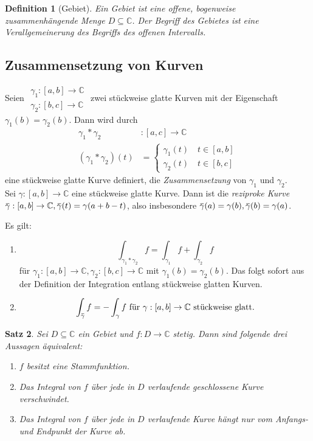 \documentclass[a4paper,12pt]{book}
\theoremstyle{newthm}
\newtheorem{thm}{Satz}[section]
\theoremstyle{newdef}
\newtheorem{defn}[thm]{Definition}
\theoremstyle{newrem}
\newcommand{\C}{\mathbb{C}}
\newcommand{\overbar}[1]{\mkern 1.5mu\overline{\mkern-1.5mu#1\mkern-1.5mu}\mkern 1.5mu}
\begin{document}
		\begin{defn}[Gebiet]
			Ein \emph{Gebiet} ist eine offene, bogenweise zusammenhängende Menge $ D \subseteq \C $. Der Begriff des Gebietes ist eine Verallgemeinerung des Begriffs des offenen Intervalls.
		\end{defn}
	
		\subsection*{Zusammensetzung von Kurven}
		Seien $\begin{aligned}
			\gamma_1 : [a,b] \to \C\\
			\gamma_2 : [b,c] \to \C
		\end{aligned}$ zwei stückweise glatte Kurven mit der Eigenschaft $ \gamma_1(b) = \gamma_2(b) $. Dann wird durch 
		\begin{align*}
			\gamma_1 * \gamma_2 &: [a,c] \to \C\\
			(\gamma_1 * \gamma_2)(t) &= \begin{cases}
				\gamma_1 (t) \quad t \in [a,b]\\
				\gamma_2 (t) \quad t \in [b,c]
				\end{cases}
		\end{align*}
		eine stückweise glatte Kurve definiert, die \emph{Zusammensetzung} von $\gamma_1$ und $\gamma_2$.\\
		Sei $ \gamma: [a,b] \to \C $ eine stückweise glatte Kurve. Dann ist die \emph{reziproke Kurve} $ \overbar{\gamma}: [a,b] \to \C, \overbar{\gamma}(t) = \gamma(a+b-t)$, also insbesondere $ \overbar{\gamma}(a) = \gamma(b), \overbar{\gamma}(b) = \gamma(a) $.
		
		Es gilt:
		\begin{enumerate}[label={\roman*})]
			\item $$\int_{\gamma_1 * \gamma_2} f = \int_{\gamma_1} f + \int_{\gamma_2} f $$ für $ \gamma_1: [a,b] \to \C, \gamma_2:[b,c]\to\C $ mit $ \gamma_1(b)=\gamma_2(b) $. Das folgt sofort aus der Definition der Integration entlang stückweise glatten Kurven.
			\item \[ \int_{\overbar{\gamma}} f = -\int_\gamma f\ \text{für $\gamma: [a,b] \to \C$ stückweise glatt.} \]
		\end{enumerate}
		
		\begin{thm}\label{2.2.4}
			Sei $ D \subseteq \C $ ein Gebiet und $ f: D \to \C $ stetig. Dann sind folgende drei Aussagen äquivalent:
			\begin{enumerate}[label={\roman*})]
				\item $f$ besitzt eine Stammfunktion.
				\item Das Integral von $f$ über jede in $D$ verlaufende geschlossene Kurve verschwindet.
				\item Das Integral von $f$ über jede in $D$ verlaufende Kurve hängt nur vom Anfangs- und Endpunkt der Kurve ab.
			\end{enumerate}
		\end{thm}
		
\end{document}
